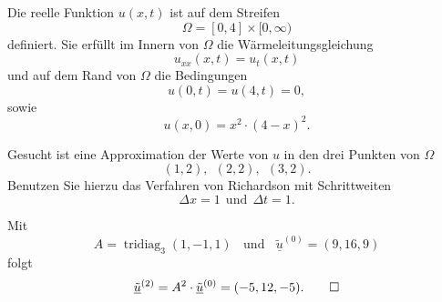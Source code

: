 Die reelle Funktion $u(x,t)$ ist auf dem Streifen
\[
\Omega = [0, 4] \times [0,\infty)
\]
definiert. Sie erfüllt im Innern von $\Omega$ die Wärmeleitungsgleichung
\[
u_{xx}(x,t) = u_{t}(x,t)
\]
und auf dem Rand von $\Omega$ die Bedingungen
\[
u(0,t) = u(4,t) = 0,
\]
sowie
\[
u(x,0) = x^2 \cdot (4-x)^2.
\]
\vspace{1mm}

Gesucht ist eine Approximation der Werte von $u$ in den drei Punkten von
$\Omega$
\[
(1,2), \ \  (2,2), \ \ (3,2).
\]
Benutzen Sie hierzu das Verfahren von Richardson mit Schrittweiten
\[
\Delta x = 1 \ \ \text{und} \ \  \Delta t = 1.
\]

\begin{loesung}
Mit
\[
A = \operatorname{tridiag}_3(1,-1,1) \ \ \ \ \text{und}  \ \ \ \ \underline{\tilde u}^{(0)} = (9, 16, 9)
\]
folgt
\[
\underline{\tilde u}^{(2)} = A^2 \cdot \underline{\tilde u}^{(0)} = (-5, 12, -5).
\qedhere
\]
\end{loesung}

